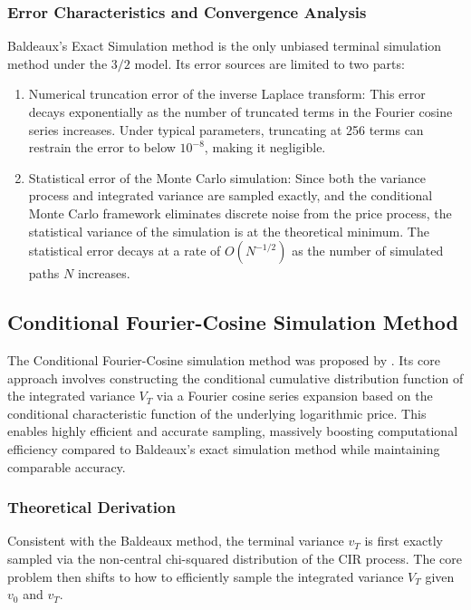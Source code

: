 \subsubsection{Error Characteristics and Convergence Analysis}
Baldeaux's Exact Simulation method is the only unbiased terminal simulation method under the $3/2$ model. Its error sources are limited to two parts:
\begin{enumerate}
  \item Numerical truncation error of the inverse Laplace transform: This error decays exponentially as the number of truncated terms in the Fourier cosine series increases. Under typical parameters, truncating at 256 terms can restrain the error to below $10^{-8}$, making it negligible.
  \item Statistical error of the Monte Carlo simulation: Since both the variance process and integrated variance are sampled exactly, and the conditional Monte Carlo framework eliminates discrete noise from the price process, the statistical variance of the simulation is at the theoretical minimum. The statistical error decays at a rate of $O(N^{-1/2})$ as the number of simulated paths $N$ increases.
\end{enumerate}

\subsection{Conditional Fourier-Cosine Simulation Method}

The Conditional Fourier-Cosine simulation method was proposed by \citet{brignoneExactSimulationStochastic2026}. Its core approach involves constructing the conditional cumulative distribution function of the integrated variance $V_T$ via a Fourier cosine series expansion based on the conditional characteristic function of the underlying logarithmic price. This enables highly efficient and accurate sampling, massively boosting computational efficiency compared to Baldeaux's exact simulation method while maintaining comparable accuracy.

\subsubsection{Theoretical Derivation}
Consistent with the Baldeaux method, the terminal variance $v_T$ is first exactly sampled via the non-central chi-squared distribution of the CIR process. The core problem then shifts to how to efficiently sample the integrated variance $V_T$ given $v_0$ and $v_T$.

